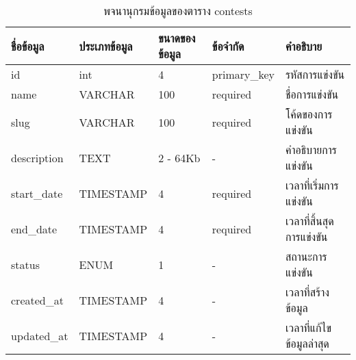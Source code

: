 \begin{table}[H]
    \caption{พจนานุกรมข้อมูลของตาราง contests}
    \label{tab:database-contests}
    \begin{tabularx}{\textwidth}{ | p{2.25cm} | p{2.20cm} | p{2.45cm} | p{2.15cm} | X | }
    \hline
    \textbf{ชื่อข้อมูล} & \textbf{ประเภทข้อมูล} & \textbf{ขนาดของข้อมูล} & \textbf{ข้อจำกัด} & \textbf{คำอธิบาย} \\
    \hline
    id & int & 4 & primary\_key & รหัสการแข่งขัน \\
    \hline
    name & VARCHAR & 100 & required & ชื่อการแข่งขัน \\
    \hline
    slug & VARCHAR & 100 & required & โค้ดของการแข่งขัน \\
    \hline
    description & TEXT & 2 - 64Kb & - & คำอธิบายการแข่งขัน \\
    \hline
    start\_date & TIMESTAMP & 4 & required & เวลาที่เริ่มการแข่งขัน \\
    \hline
    end\_date & TIMESTAMP & 4 & required & เวลาที่สิ้นสุดการแข่งขัน \\
    \hline
    status & ENUM & 1 & -  & สถานะการแข่งขัน \\
    \hline
    created\_at & TIMESTAMP & 4 & - & เวลาที่สร้างข้อมูล \\
    \hline
    updated\_at & TIMESTAMP & 4 & - & เวลาที่แก้ไขข้อมูลล่าสุด \\
    \hline
    \end{tabularx}
\end{table}
